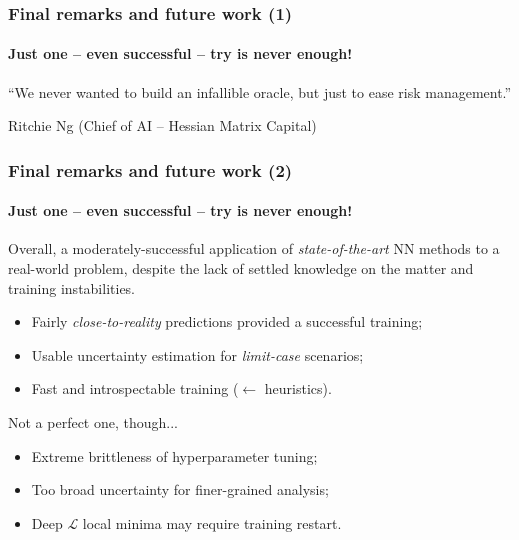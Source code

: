 \documentclass{beamer}
\begin{document}
{\begin{frame}
\end{frame}
\begin{frame}
	\frametitle{Final remarks and future work (1)}
	\framesubtitle{Just one -- even successful -- try is never enough!}

	\begin{displayquote}
		“We never wanted to build an infallible oracle, but just to ease risk management.”
		\begin{flushright}Ritchie Ng (Chief of AI -- Hessian Matrix Capital) \end{flushright}
	\end{displayquote}

\end{frame}


\begin{frame}
	\frametitle{Final remarks and future work (2)}
	\framesubtitle{Just one -- even successful -- try is never enough!}

	Overall, a moderately-successful application of \textit{state-of-the-art} NN methods to a real-world problem, despite the lack of settled knowledge on the matter and training instabilities.
	\hfill \break
	\begin{itemize}
		\item{Fairly \textit{close-to-reality} predictions provided a successful training;}
		\item{Usable uncertainty estimation for \textit{limit-case} scenarios;}
		\item{Fast and introspectable training ($\leftarrow$ heuristics).}
	\end{itemize}
	\hfill \break
	Not a perfect one, though...
	\hfill \break
	\begin{itemize}
		\item{Extreme brittleness of hyperparameter tuning;}
		\item{Too broad uncertainty for finer-grained analysis;}
		\item{Deep $\mathcal{L}$ local minima may require training restart.}
	\end{itemize}

\end{frame}
}
\end{document}
